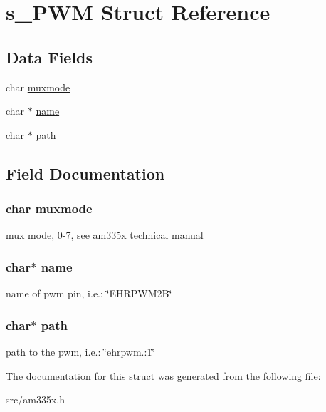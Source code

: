 \hypertarget{structs___p_w_m}{\section{s\-\_\-\-P\-W\-M Struct Reference}
\label{structs___p_w_m}
}
\subsection*{Data Fields}
\begin{DoxyCompactItemize}
\item 
char \hyperlink{structs___p_w_m_a29c76b00b745b2dd207ac576dcb658c3}{muxmode}
\item 
char $\ast$ \hyperlink{structs___p_w_m_a5ac083a645d964373f022d03df4849c8}{name}
\item 
char $\ast$ \hyperlink{structs___p_w_m_a44196e6a5696d10442c29e639437196e}{path}
\end{DoxyCompactItemize}


\subsection{Field Documentation}
\hypertarget{structs___p_w_m_a29c76b00b745b2dd207ac576dcb658c3}{
\subsubsection[{muxmode}]{\setlength{\rightskip}{0pt plus 5cm}char muxmode}}\label{structs___p_w_m_a29c76b00b745b2dd207ac576dcb658c3}
mux mode, 0-\/7, see am335x technical manual \hypertarget{structs___p_w_m_a5ac083a645d964373f022d03df4849c8}{
\subsubsection[{name}]{\setlength{\rightskip}{0pt plus 5cm}char$\ast$ name}}\label{structs___p_w_m_a5ac083a645d964373f022d03df4849c8}
name of pwm pin, i.\-e.\-: \char`\"{}\-E\-H\-R\-P\-W\-M2\-B\char`\"{} \hypertarget{structs___p_w_m_a44196e6a5696d10442c29e639437196e}{
\subsubsection[{path}]{\setlength{\rightskip}{0pt plus 5cm}char$\ast$ path}}\label{structs___p_w_m_a44196e6a5696d10442c29e639437196e}
path to the pwm, i.\-e.\-: \char`\"{}ehrpwm.\-:1\char`\"{} 

The documentation for this struct was generated from the following file\-:\begin{DoxyCompactItemize}
\item 
src/am335x.\-h\end{DoxyCompactItemize}
